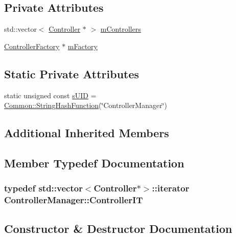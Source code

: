 \subsection*{Private Attributes}
\begin{DoxyCompactItemize}
\item 
std\+::vector$<$ \hyperlink{classController}{Controller} $\ast$ $>$ \hyperlink{classControllerManager_a6cf26f1ec8e699d09946f64035e7a799}{m\+Controllers}
\item 
\hyperlink{classControllerFactory}{Controller\+Factory} $\ast$ \hyperlink{classControllerManager_aaa89dac535e0fd52035040f2c7ab3e11}{m\+Factory}
\end{DoxyCompactItemize}
\subsection*{Static Private Attributes}
\begin{DoxyCompactItemize}
\item 
static unsigned const \hyperlink{classControllerManager_a3071df05318f3aac6047e98df59fdbf4}{s\+U\+ID} = \hyperlink{namespaceCommon_a994c43a8ea7b03968186a635687a6521}{Common\+::\+String\+Hash\+Function}(\char`\"{}Controller\+Manager\char`\"{})
\end{DoxyCompactItemize}
\subsection*{Additional Inherited Members}


\subsection{Member Typedef Documentation}
\subsubsection[{\texorpdfstring{Controller\+IT}{ControllerIT}}]{\setlength{\rightskip}{0pt plus 5cm}typedef std\+::vector$<${\bf Controller}$\ast$$>$\+::iterator {\bf Controller\+Manager\+::\+Controller\+IT}}\hypertarget{classControllerManager_a0f09bc96bcff03cab101dabf6a661959}{}\label{classControllerManager_a0f09bc96bcff03cab101dabf6a661959}


\subsection{Constructor \& Destructor Documentation}
